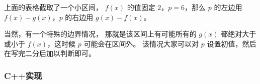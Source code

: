 上面的表格截取了一个小区间，
$f(x)$ 的值固定 $2$，$p=6$，那么 $p$ 的左边用 $f(x)-g(x)$，$p$ 的右边用 $g(x)-f(x)$。

当然，有一个特殊的边界情况，
那就是该区间上有可能所有的 $g(x)$ 都绝对大于或小于 $f(x)$，这时候 $p$ 可能会在区间外。
该情况大家可以对 $p$ 设置初值，然后在写完二分后加以判断即可。

\subsubsection{C++实现}

